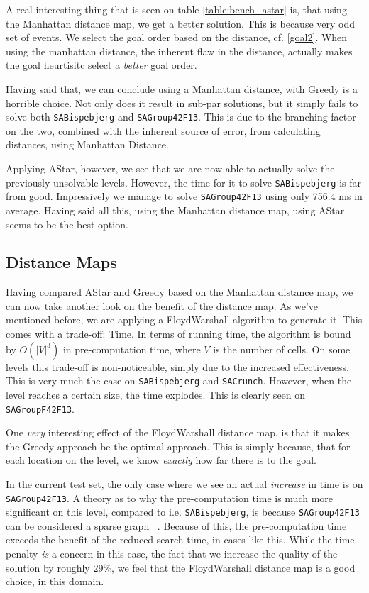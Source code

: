 \documentclass[letterpaper]{article}
\begin{document}
		A real interesting thing that is seen on table \ref{table:bench_astar} is, that using the Manhattan distance map, we get a better solution. This is because very odd set of events. We select the goal order based on the distance, cf. \ref{goal2}. When using the manhattan distance, the inherent flaw in the distance, actually makes the goal heurtisitc select a \emph{better} goal order.

		Having said that, we can conclude using a Manhattan distance, with Greedy is a horrible choice. Not only does it result in sub-par solutions, but it simply fails to solve both \verb=SABispebjerg= and \verb=SAGroup42F13=. This is due to the branching factor on the two, combined with the inherent source of error, from calculating distances, using Manhattan Distance. 

		Applying AStar, however, we see that we are now able to actually solve the previously unsolvable levels. However, the time for it to solve \verb=SABispebjerg= is far from good. Impressively we manage to solve \verb=SAGroup42F13= using only 756.4 ms in average. Having said all this, using the Manhattan distance map, using AStar seems to be the best option.


	\subsection{Distance Maps}
		Having compared AStar and Greedy based on the Manhattan distance map, we can now take another look on the benefit of the distance map. As we've mentioned before, we are applying a FloydWarshall algorithm to generate it. This comes with a trade-off: Time. In terms of running time, the algorithm is bound by $O(|V|^3)$ in pre-computation time, where $V$ is the number of cells. On some levels this trade-off is non-noticeable, simply due to the increased effectiveness. This is very much the case on \verb=SABispebjerg= and \verb=SACrunch=. However, when the level reaches a certain size, the time explodes. This is clearly seen on \verb=SAGroupF42F13=.

		One \emph{very} interesting effect of the FloydWarshall distance map, is that it makes the Greedy approach be the optimal approach. This is simply because, that for each location on the level, we know \emph{exactly} how far there is to the goal.

		In the current test set, the only case where we see an actual \emph{increase} in time is on \verb=SAGroup42F13=. A theory as to why the pre-computation time is much more significant on this level, compared to i.e. \verb=SABispebjerg=, is because \verb=SAGroup42F13= can be considered a sparse graph ~\cite{sparse}. Because of this, the pre-computation time exceeds the benefit of the reduced search time, in cases like this. While the time penalty \emph{is} a concern in this case, the fact that we increase the quality of the solution by roughly $29\%$, we feel that the FloydWarshall distance map is a good choice, in this domain.
\end{document}
